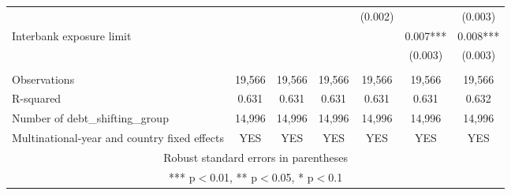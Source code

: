 \begin{tabular}{lcccccc}
 &  &  &  & (0.002) &  & (0.003) \\
Interbank exposure limit &  &  &  &  & 0.007*** & 0.008*** \\
 &  &  &  &  & (0.003) & (0.003) \\
 &  &  &  &  &  &  \\
Observations & 19,566 & 19,566 & 19,566 & 19,566 & 19,566 & 19,566 \\
R-squared & 0.631 & 0.631 & 0.631 & 0.631 & 0.631 & 0.632 \\
Number of debt\_shifting\_group & 14,996 & 14,996 & 14,996 & 14,996 & 14,996 & 14,996 \\
 Multinational-year and country fixed effects & YES & YES & YES & YES & YES & YES \\ \hline
\multicolumn{7}{c}{ Robust standard errors in parentheses} \\
\multicolumn{7}{c}{ *** p$<$0.01, ** p$<$0.05, * p$<$0.1} \\
\end{tabular}
